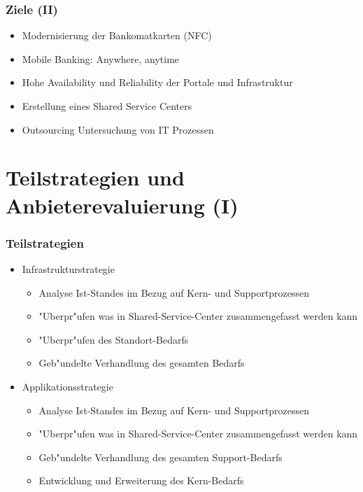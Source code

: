 \documentclass{beamer}
\begin{document}
\begin{frame}
  \frametitle{Ziele (II)}
  \begin{itemize}

	\item Modernisierung der Bankomatkarten (NFC)\vspace{2mm}
	\item Mobile Banking: Anywhere, anytime\vspace{2mm}
	\item Hohe Availability und Reliability der Portale und Infrastruktur\vspace{2mm}
	\item Erstellung eines Shared Service Centers \vspace{2mm}
	\item Outsourcing Untersuchung von IT Prozessen\vspace{2mm}

  \end{itemize}
\end{frame}


\section{Teilstrategien und Anbieterevaluierung (I)}

\begin{frame}
  \frametitle{Teilstrategien}
  \begin{itemize}

	\item Infrastrukturstrategie
		\begin{itemize}
			\item Analyse Ist-Standes im Bezug auf Kern- und Supportprozessen
			\item "Uberpr"ufen was in Shared-Service-Center zusammengefasst werden kann
			\item "Uberpr"ufen des  Standort-Bedarfs
			\item Geb"undelte Verhandlung des gesamten Bedarfs  \vspace{2mm}
		\end{itemize}
		
	\item Applikationsstrategie
			\begin{itemize}
			\item Analyse Ist-Standes im Bezug auf Kern- und Supportprozessen
			\item "Uberpr"ufen was in Shared-Service-Center zusammengefasst werden kann
			\item Geb"undelte Verhandlung des gesamten Support-Bedarfs
			\item Entwicklung und Erweiterung des Kern-Bedarfs  \vspace{2mm}
		\end{itemize}
  \end{itemize}
\end{frame}
\end{document}
